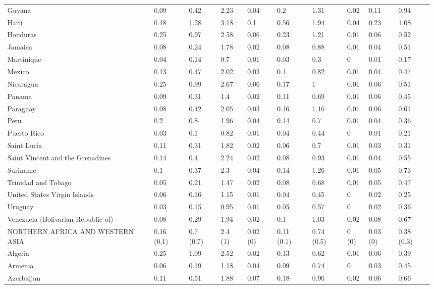 \begin{longtable}[t]{llllllllll}
Guyana & 0.09 & 0.42 & 2.23 & 0.04 & 0.2 & 1.31 & 0.02 & 0.11 & 0.94\\
Haiti & 0.18 & 1.28 & 3.18 & 0.1 & 0.56 & 1.94 & 0.04 & 0.23 & 1.08\\
Honduras & 0.25 & 0.97 & 2.58 & 0.06 & 0.23 & 1.21 & 0.01 & 0.06 & 0.52\\
Jamaica & 0.08 & 0.24 & 1.78 & 0.02 & 0.08 & 0.88 & 0.01 & 0.04 & 0.51\\
Martinique & 0.04 & 0.14 & 0.7 & 0.01 & 0.03 & 0.3 & 0 & 0.01 & 0.17\\
Mexico & 0.13 & 0.47 & 2.02 & 0.03 & 0.1 & 0.82 & 0.01 & 0.04 & 0.47\\
Nicaragua & 0.25 & 0.99 & 2.67 & 0.06 & 0.17 & 1 & 0.01 & 0.06 & 0.51\\
Panama & 0.09 & 0.31 & 1.4 & 0.02 & 0.11 & 0.69 & 0.01 & 0.06 & 0.45\\
Paraguay & 0.08 & 0.42 & 2.05 & 0.03 & 0.16 & 1.16 & 0.01 & 0.06 & 0.61\\
Peru & 0.2 & 0.8 & 1.96 & 0.04 & 0.14 & 0.7 & 0.01 & 0.04 & 0.36\\
Puerto Rico & 0.03 & 0.1 & 0.82 & 0.01 & 0.04 & 0.44 & 0 & 0.01 & 0.21\\
Saint Lucia & 0.11 & 0.31 & 1.82 & 0.02 & 0.06 & 0.7 & 0.01 & 0.03 & 0.31\\
Saint Vincent and the Grenadines & 0.14 & 0.4 & 2.24 & 0.02 & 0.08 & 0.93 & 0.01 & 0.04 & 0.55\\
Suriname & 0.1 & 0.37 & 2.3 & 0.04 & 0.14 & 1.26 & 0.01 & 0.05 & 0.73\\
Trinidad and Tobago & 0.05 & 0.21 & 1.47 & 0.02 & 0.08 & 0.68 & 0.01 & 0.05 & 0.47\\
United States Virgin Islands & 0.06 & 0.16 & 1.15 & 0.01 & 0.04 & 0.45 & 0 & 0.02 & 0.25\\
Uruguay & 0.03 & 0.15 & 0.95 & 0.01 & 0.05 & 0.57 & 0 & 0.02 & 0.36\\
Venezuela (Bolivarian Republic of) & 0.08 & 0.29 & 1.94 & 0.02 & 0.1 & 1.03 & 0.02 & 0.08 & 0.67\\
NORTHERN AFRICA AND WESTERN ASIA & 0.16 (0.1) & 0.7 (0.7) & 2.4 (1) & 0.02 (0) & 0.11 (0.1) & 0.74 (0.5) & 0 (0) & 0.03 (0) & 0.38 (0.3)\\
Algeria & 0.25 & 1.09 & 2.52 & 0.02 & 0.13 & 0.62 & 0.01 & 0.06 & 0.39\\
Armenia & 0.06 & 0.19 & 1.18 & 0.04 & 0.09 & 0.74 & 0 & 0.03 & 0.45\\
Azerbaijan & 0.11 & 0.51 & 1.88 & 0.07 & 0.18 & 0.96 & 0.02 & 0.06 & 0.66\\

\end{longtable}
